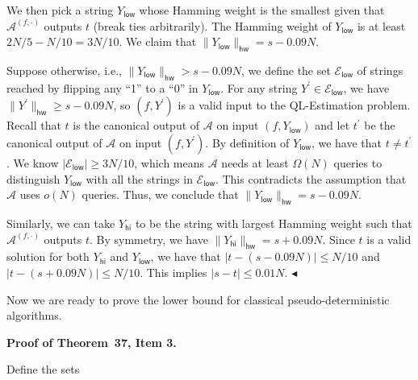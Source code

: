 \documentclass[10pt,a4paper]{article}
\begin{document}
We then pick a string $Y_{\mathsf{low}}$ whose Hamming weight is the smallest given that $\mathcal{A}^{(f,\cdot)}$ outputs $t$ (break ties arbitrarily). The Hamming weight of $Y_{\mathsf{low}}$ is at least $2N/5-N/10=3N/10$. We claim that $\|Y_{\mathsf{low}}\|_{\mathsf{hw}}=s-0.09N$.\par




Suppose otherwise, i.e., $\|Y_{\mathsf{low}}\|_{\mathsf{hw}}>s-0.09N$, we define the set $\mathcal{E}_{\mathsf{low}}$ of strings reached by flipping any “1” to a “0” in $Y_{\mathsf{low}}$. For any string $Y^{\prime}\in\mathcal{E}_{\mathsf{low}}$, we have $\|Y^{\prime}\|_{\mathsf{hw}}\geq s-0.09N$, so $(f,Y^{\prime})$ is a valid input to the QL-Estimation problem.
Recall that $t$ is the canonical output of $\mathcal{A}$ on input $(f,Y_{\mathsf{low}})$ and let $t^{\prime}$ be the canonical output of $\mathcal{A}$ on input $(f,Y^{\prime})$. By definition of $Y_{\mathsf{low}}$, we have that $t\neq t^{\prime}$. We know $|\mathcal{E}_{\mathsf{low}}|\geq 3N/10$, which means $\mathcal{A}$ needs at least $\Omega(N)$ queries to distinguish $Y_{\mathsf{low}}$ with all the strings in $\mathcal{E}_{\mathsf{low}}$. This contradicts the assumption that $\mathcal{A}$ uses $o(N)$ queries. Thus, we conclude that $\|Y_{\mathsf{low}}\|_{\mathsf{hw}}=s-0.09N$.\par




Similarly, we can take $Y_{\mathsf{hi}}$ to be the string with largest Hamming weight such that $\mathcal{A}^{(f,\cdot)}$ outputs $t$. By symmetry, we have $\|Y_{\mathsf{hi}}\|_{\mathsf{hw}}=s+0.09N$. Since $t$ is a valid solution for both $Y_{\mathsf{hi}}$ and $Y_{\mathsf{low}}$, we have that $|t-(s-0.09N)|\leq N/10$ and $|t-(s+0.09N)|\leq N/10$. This implies $|s-t|\leq 0.01N$.
$\blacktriangleleft$\par




Now we are ready to prove the lower bound for classical pseudo-deterministic algorithms.\par





\par\medskip\noindent\textbf{Proof of Theorem 37, Item 3.}\par




Define the sets\par
\end{document}
